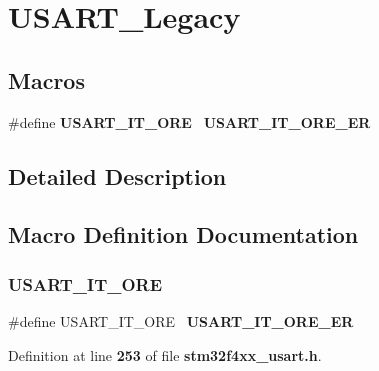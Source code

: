 \section{U\+S\+A\+R\+T\+\_\+\+Legacy}
\label{group__USART__Legacy}
\subsection*{Macros}
\begin{DoxyCompactItemize}
\item 
\#define \textbf{ U\+S\+A\+R\+T\+\_\+\+I\+T\+\_\+\+O\+RE}~\textbf{ U\+S\+A\+R\+T\+\_\+\+I\+T\+\_\+\+O\+R\+E\+\_\+\+ER}
\end{DoxyCompactItemize}


\subsection{Detailed Description}


\subsection{Macro Definition Documentation}
\mbox{\label{group__USART__Legacy_ga8b7d40e02a81be787fbb325bbe6dfbeb}} 
\subsubsection{U\+S\+A\+R\+T\+\_\+\+I\+T\+\_\+\+O\+RE}
{\footnotesize\ttfamily \#define U\+S\+A\+R\+T\+\_\+\+I\+T\+\_\+\+O\+RE~\textbf{ U\+S\+A\+R\+T\+\_\+\+I\+T\+\_\+\+O\+R\+E\+\_\+\+ER}}



Definition at line \textbf{ 253} of file \textbf{ stm32f4xx\+\_\+usart.\+h}.

